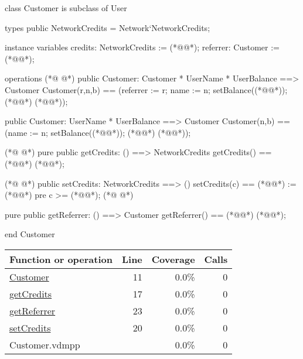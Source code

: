 \begin{vdmpp}[breaklines=true]
class Customer is subclass of User

types
 public NetworkCredits = Network`NetworkCredits;

instance variables 
 credits: NetworkCredits := (*@@*);
 referrer: Customer := (*@@*);
 
operations
(*@
\label{Customer:11}
@*)
 public Customer: Customer * UserName * UserBalance ==> Customer
 Customer(r,n,b) == (referrer := r; name := n; setBalance((*@@*)); (*@@*) (*@@*));
 
 public Customer: UserName * UserBalance ==> Customer
 Customer(n,b) == (name := n; setBalance((*@@*)); (*@@*) (*@@*));
 
(*@
\label{getCredits:17}
@*)
 pure public getCredits: () ==> NetworkCredits
 getCredits() == (*@@*) (*@@*);
 
(*@
\label{setCredits:20}
@*)
 public setCredits: NetworkCredits ==> ()
 setCredits(c) == (*@@*) := (*@@*)
 pre c >= (*@@*);
(*@
\label{getReferrer:23}
@*)
 
 pure public getReferrer: () ==> Customer
 getReferrer() == (*@@*) (*@@*);

end Customer
\end{vdmpp}
\bigskip
\begin{longtable}{|l|r|r|r|}
\hline
Function or operation & Line & Coverage & Calls \\
\hline
\hline
\hyperref[Customer:11]{Customer} & 11&0.0\% & 0 \\
\hline
\hyperref[getCredits:17]{getCredits} & 17&0.0\% & 0 \\
\hline
\hyperref[getReferrer:23]{getReferrer} & 23&0.0\% & 0 \\
\hline
\hyperref[setCredits:20]{setCredits} & 20&0.0\% & 0 \\
\hline
\hline
Customer.vdmpp & & 0.0\% & 0 \\
\hline
\end{longtable}


